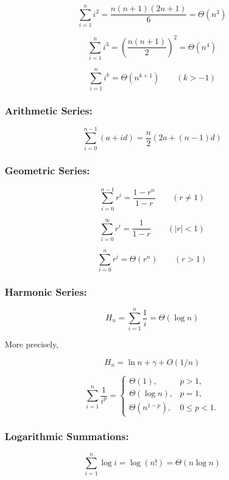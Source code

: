 \documentclass[11pt]{article}
\begin{document}
\[
\sum_{i=1}^{n} i^2
= \frac{n(n+1)(2n+1)}{6}
= \Theta(n^3)
\]

\[
\sum_{i=1}^{n} i^3
= \left(\frac{n(n+1)}{2}\right)^2
= \Theta(n^4)
\]

\[
\sum_{i=1}^{n} i^k = \Theta(n^{k+1})
\qquad (k > -1)
\]


\subsubsection{Arithmetic Series:}

\[
\sum_{i=0}^{n-1} (a+id)
=
\frac{n}{2}\left(2a+(n-1)d\right)
\]

\subsubsection{Geometric Series:}

\[
\sum_{i=0}^{n-1} r^i
=
\frac{1-r^n}{1-r}
\qquad (r\neq 1)
\]

\[
\sum_{i=0}^{\infty} r^i
=
\frac{1}{1-r}
\qquad (|r|<1)
\]

\[
\sum_{i=0}^{n} r^i = \Theta(r^n)
\qquad (r>1)
\]


\subsubsection{Harmonic Series:}

\[
H_n
=
\sum_{i=1}^{n}\frac{1}{i}
=
\Theta(\log n)
\]

More precisely,

\[
H_n = \ln n + \gamma + O(1/n)
\]

\[
\sum_{i=1}^{n}\frac{1}{i^p}
=
\begin{cases}
\Theta(1), & p>1,\\
\Theta(\log n), & p=1,\\
\Theta(n^{1-p}), & 0\leq p<1.
\end{cases}
\]


\subsubsection{Logarithmic Summations:}

\[
\sum_{i=1}^{n}\log i
=
\log(n!)
=
\Theta(n\log n)
\]
\end{document}
